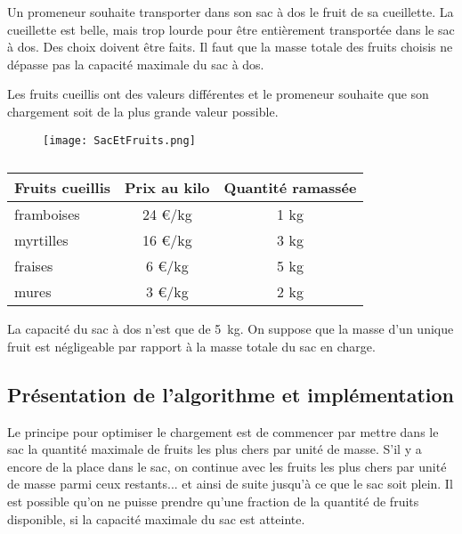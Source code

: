 \setcounter{numques}{0}

Un promeneur souhaite transporter dans son sac à dos le fruit de sa cueillette. La cueillette est belle, mais trop lourde pour être entièrement transportée dans le sac à dos. Des choix doivent être faits. Il faut que la masse totale des fruits choisis ne dépasse pas la capacité maximale du sac à dos.

Les fruits cueillis ont des valeurs différentes et le promeneur souhaite que son chargement soit de la plus grande valeur possible.

\begin{figure}[h]
\centering
\texttt{[image: SacEtFruits.png]}
\label{fig:SacEtFruits}
\end{figure}



\begin{table}[h]
\centering
\begin{tabular}{|l|c|c|}
\hline
Fruits cueillis	& Prix au kilo & Quantité ramassée\\
\hline
framboises& 24 €/kg  & 1 kg \\
myrtilles & 16 €/kg & 3 kg  \\
fraises & 6 €/kg & 5 kg \\
mures & 3 €/kg & 2 kg \\
\hline
\end{tabular}
\caption{}
\label{tab_fruit}
\end{table}

La capacité du sac à dos n’est que de \SI{5}{kg}.
On suppose que la masse d’un unique fruit est négligeable par rapport à la masse totale du sac en charge.

\subsection*{Présentation de l’algorithme et implémentation}
\label{sec:PrésentationDeLAlgorithmeEtImplémentation}

Le principe pour optimiser le chargement est de commencer par mettre dans le sac la quantité maximale de fruits les plus chers par unité de masse. S’il y a encore de la place dans le sac, on continue avec les fruits les plus chers par unité de masse parmi ceux restants... et ainsi de suite jusqu’à ce que le sac soit plein. Il est possible qu’on ne puisse prendre qu’une fraction de la quantité de fruits disponible, si la capacité maximale du sac est atteinte. %

